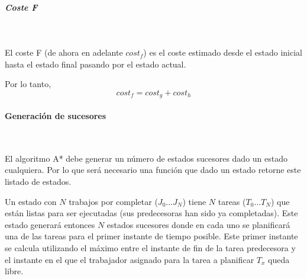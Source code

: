 \subparagraph{Coste F}~

El coste F (de ahora en adelante $cost_f$) es el coste estimado desde el estado inicial
hasta el estado final pasando por el estado actual.

Por lo tanto, \[cost_f = cost_g + cost_h\]

\pagebreak

\paragraph{Generación de sucesores}~

El algoritmo A* debe generar un número de estados sucesores dado un estado cualquiera.
Por lo que será necesario una función que dado un estado retorne este listado de estados.

Un estado con $N$ trabajos por completar ($J_0 \dots J_N$)
tiene $N$ tareas ($T_0 \dots T_N$) que están listas para ser ejecutadas
(sus predecesoras han sido ya completadas).
Este estado generará entonces $N$ estados sucesores
donde en cada uno se planificará una de las tareas
para el primer instante de tiempo posible.
Este primer instante se calcula utilizando el
máximo entre el instante de fin de la tarea predecesora y
el instante en el que el trabajador asignado
para la tarea a planificar $T_x$ queda libre.


